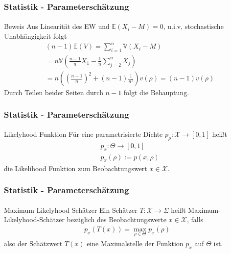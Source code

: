 \documentclass{beamer}
\begin{document}
\begin{frame}
    \frametitle{Statistik - Parameterschätzung}
\framesubtitle{}

\begin{block}{Beweis}
Aus Linearität des EW und $\mathbb{E}(X_i - M) = 0$, u.i.v, stochastische Unabhängigkeit folgt
\begin{align*}
&(n-1) \mathbb{E}(V)  = \sum_{i=1}^n  \mathbb{V}(X_i - M) \\
& = n   \mathbb{V} (\frac{n-1}{n} X_1  - \frac{1}{n} \sum_{j=2}^n X_j) \\
& = n((\frac{n-1}{n})^2 + (n-1) \frac{1}{n^2}  ) v(\rho) = (n-1) v(\rho)
\end{align*}
Durch Teilen beider Seiten durch $n-1$ folgt die Behauptung. 
\end{block}


 \end{frame}




\begin{frame}
    \frametitle{Statistik - Parameterschätzung}
\framesubtitle{}

\begin{block}{Likelyhood Funktion}
Für eine parametrisierte Dichte $p_\rho : \mathcal{X}   \to  [0,1]$ heißt 
\begin{align*}
& p_x  : \Theta   \to  [0,1] \\
& p_x(\rho):=  p(x, \rho) 
\end{align*}
die Likelihood Funktion zum Beobachtungswert $x \in \mathcal{X}$.

\end{block}
 \end{frame}



\begin{frame}
    \frametitle{Statistik - Parameterschätzung}
\framesubtitle{}
\begin{block}{Maximum Likelyhood Schätzer}
Ein Schätzer $T: \mathcal{X} \to \Sigma$ heißt Maximum-Likelyhood-Schätzer
 bezüglich des Beobachtungswerte $x \in \mathcal{X}$, falls
\begin{align*}
p_x(T(x)) = \max_{\rho \in \Theta} p_x (\rho) 
\end{align*}
also der Schätzwert $T(x)$ eine Maximalstelle der Funktion  $p_x$ auf $\Theta$ ist.
\end{block}

 \end{frame}
\end{document}

